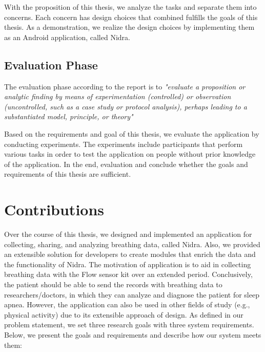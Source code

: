 With the proposition of this thesis, we analyze the tasks and separate them into concerns. Each concern has design choices that combined fulfills the goals of this thesis. As a demonstration, we realize the design choices by implementing them as an Android application, called Nidra. 

\subsection{Evaluation Phase}
The evaluation phase according to the report is to \textit{"evaluate a proposition or analytic finding by means of experimentation (controlled) or observation (uncontrolled, such as a case study or protocol analysis), perhaps leading to a substantiated model, principle, or theory"}

Based on the requirements and goal of this thesis, we evaluate the application by conducting experiments. The experiments include participants that perform various tasks in order to test the application on people without prior knowledge of the application. In the end, evaluation and conclude whether the goals and requirements of this thesis are sufficient.

\section{Contributions}
Over the course of this thesis, we designed and implemented an application for collecting, sharing, and analyzing breathing data, called Nidra. Also, we provided an extensible solution for developers to create modules that enrich the data and the functionality of Nidra. The motivation of application is to aid in collecting breathing data with the Flow sensor kit over an extended period. Conclusively, the patient should be able to send the records with breathing data to researchers/doctors, in which they can analyze and diagnose the patient for sleep apnea. However, the application can also be used in other fields of study (e.g., physical activity)  due to its extensible approach of design. As defined in our problem statement, we set three research goals with three system requirements. Below, we present the goals and requirements and describe how our system meets them:

